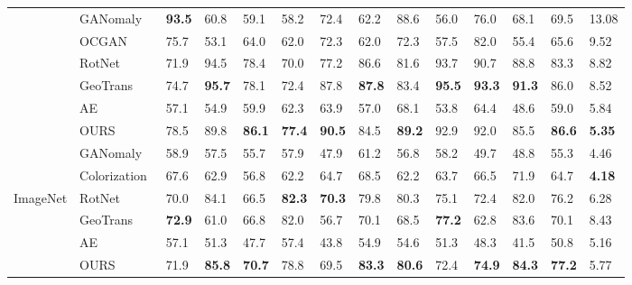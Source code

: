 \documentclass[journal]{IEEEtran}
\begin{document}
\begin{table*}[!htb]
\begin{minipage}[t]{0.95\textwidth}
\begin{tabular}{cx{2.0cm}x{0.6cm}x{0.6cm}x{0.6cm}x{0.6cm}x{0.6cm}x{0.6cm}x{0.6cm}x{0.6cm}x{0.6cm}x{0.6cm}x{0.6cm}x{0.8cm}}
	& GANomaly~\cite{Akcay2018} 
	& \textbf{93.5} & 60.8 & 59.1 & 58.2 & 72.4 & 62.2 & 88.6 & 56.0 & 76.0 & 68.1 & 69.5 & 13.08\\
	& OCGAN~\cite{perera2019ocgan} 
	& 75.7 & 53.1 & 64.0 & 62.0 & 72.3 & 62.0 & 72.3 & 57.5 & 82.0 & 55.4 & 65.6 & 9.52\\
	& RotNet~\cite{gidaris2018unsupervised}
	& 71.9 & 94.5 & 78.4 & 70.0 & 77.2 & 86.6 & 81.6 & 93.7 & 90.7 & 88.8 & 83.3 & 8.82\\
	& GeoTrans~\cite{golan2018deep} 
	& 74.7 & \textbf{95.7} & 78.1 & 72.4 & 87.8 & \textbf{87.8} & 83.4 & \textbf{95.5} & \textbf{93.3} & \textbf{91.3} & 86.0 & 8.52\\
	\cmidrule(lr){2-2} \cmidrule(lr){3-3} \cmidrule(lr){4-4} \cmidrule(lr){5-5} \cmidrule(lr){6-6} \cmidrule(lr){7-7} \cmidrule(lr){8-8} \cmidrule(lr){9-9} \cmidrule(lr){10-10} \cmidrule(lr){11-11} \cmidrule(lr){12-12} \cmidrule(lr){13-13} \cmidrule(lr){14-14}
	& AE & 57.1 & 54.9 & 59.9 & 62.3 & 63.9 & 57.0 & 68.1 & 53.8 & 64.4 & 48.6 & 59.0 & 5.84\\
	& OURS & 78.5 & 89.8 & \textbf{86.1} & \textbf{77.4} & \textbf{90.5} & 84.5 & \textbf{89.2} & 92.9 & 92.0 & 85.5 & \textbf{86.6} & \textbf{5.35}\\
	\cmidrule(lr){1-14}
	    & GANomaly~\cite{Akcay2018} 
		& 58.9 & 57.5 & 55.7 & 57.9 & 47.9 & 61.2 & 56.8 & 58.2 & 49.7 & 48.8 & 55.3 & 4.46\\
		& Colorization~\cite{zhang2016colorful}
		& 67.6 & 62.9 & 56.8 & 62.2 & 64.7 & 68.5 & 62.2 & 63.7 & 66.5 & 71.9 & 64.7 & \textbf{4.18}\\
		ImageNet & RotNet~\cite{gidaris2018unsupervised} & 70.0 & 84.1 & 66.5 & \textbf{82.3} & \textbf{70.3} & 79.8 & 80.3 & 75.1 & 72.4 & 82.0 & 76.2 & 6.28\\
		&
		GeoTrans~\cite{golan2018deep} 
		& \textbf{72.9} & 61.0 & 66.8 & 82.0 & 56.7 & 70.1 & 68.5 & \textbf{77.2} & 62.8 & 83.6 & 70.1 & 8.43\\
		\cmidrule(lr){2-2} \cmidrule(lr){3-3} \cmidrule(lr){4-4} \cmidrule(lr){5-5} \cmidrule(lr){6-6} \cmidrule(lr){7-7} \cmidrule(lr){8-8} \cmidrule(lr){9-9} \cmidrule(lr){10-10} \cmidrule(lr){11-11} \cmidrule(lr){12-12} \cmidrule(lr){13-13} \cmidrule(lr){14-14}
		& AE & 57.1 & 51.3 & 47.7 & 57.4 & 43.8 & 54.9 & 54.6 & 51.3 & 48.3 & 41.5 & 50.8 & 5.16 \\
		& OURS & 71.9 & \textbf{85.8} & \textbf{70.7} & 78.8 & 69.5 & \textbf{83.3} & \textbf{80.6} & 72.4 & \textbf{74.9} & \textbf{84.3} & \textbf{77.2} & 5.77\\
		\cmidrule(lr){1-14}
	\end{tabular}
	\end{minipage}
	

\end{table*}
\end{document}
